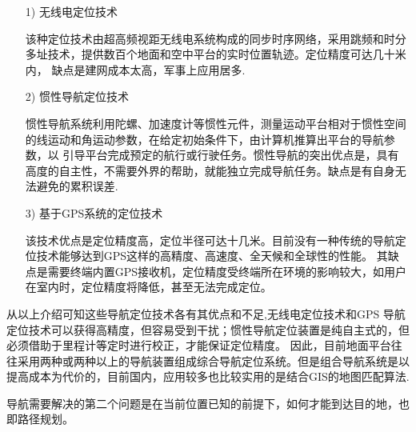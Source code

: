 \begin{itemize}
    \item [1)] 无线电定位技术 \par
        该种定位技术由超高频视距无线电系统构成的同步时序网络，采用跳频和时分
    多址技术，提供数百个地面和空中平台的实时位置轨迹。定位精度可达几十米内，
    缺点是建网成本太高，军事上应用居多.
    \item [2)] 惯性导航定位技术 \par
    惯性导航系统利用陀螺、加速度计等惯性元件，测量运动平台相对于惯性空间的线运动和角运动参数，在给定初始条件下，由计算机推算出平台的导航参数，以
    引导平台完成预定的航行或行驶任务。惯性导航的突出优点是，具有高度的自主性，不需要外界的帮助，就能独立完成导航任务。缺点是有自身无法避免的累积误差.
    \item [3)] 基于GPS系统的定位技术 \par
    该技术优点是定位精度高，定位半径可达十几米。目前没有一种传统的导航定位技术能够达到GPS这样的高精度、高速度、全天候和全球性的性能。
    其缺点是需要终端内置GPS接收机，定位精度受终端所在环境的影响较大，如用户在室内时，定位精度将降低，甚至无法完成定位。
\end{itemize}
\par 从以上介绍可知这些导航定位技术各有其优点和不足,无线电定位技术和GPS
导航定位技术可以获得高精度，但容易受到干扰；惯性导航定位装置是纯自主式的，但必须借助于里程计等定时进行校正，才能保证定位精度。
因此，目前地面平台往往采用两种或两种以上的导航装置组成综合导航定位系统。但是组合导航系统是以提高成本为代价的，目前国内，应用较多也比较实用的是结合GIS的地图匹配算法.
\par
导航需要解决的第二个问题是在当前位置已知的前提下，如何才能到达目的地，也即路径规划。

